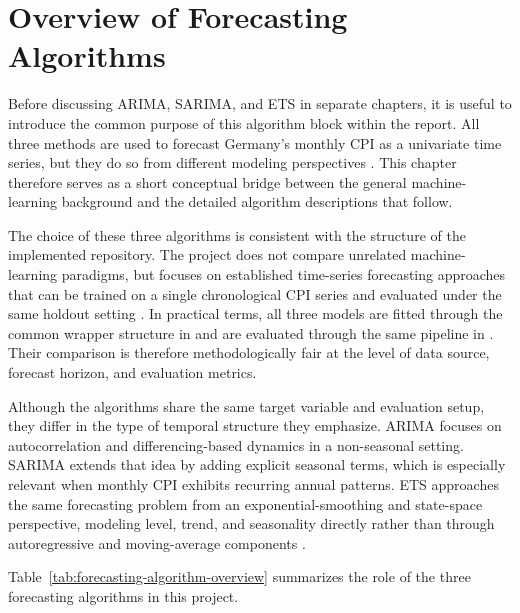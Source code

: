 %
%
%

\chapter{Overview of Forecasting Algorithms}
\label{ch:forecasting-algorithm-overview}

Before discussing ARIMA, SARIMA, and ETS in separate chapters, it is useful to introduce the common purpose of this algorithm block within the report. All three methods are used to forecast Germany's monthly CPI as a univariate time series, but they do so from different modeling perspectives \cite{Box2015,Hyndman2021}. This chapter therefore serves as a short conceptual bridge between the general machine-learning background and the detailed algorithm descriptions that follow.

The choice of these three algorithms is consistent with the structure of the implemented repository. The project does not compare unrelated machine-learning paradigms, but focuses on established time-series forecasting approaches that can be trained on a single chronological CPI series and evaluated under the same holdout setting \cite{Hyndman2021,Hu2025}. In practical terms, all three models are fitted through the common wrapper structure in  and are evaluated through the same pipeline in . Their comparison is therefore methodologically fair at the level of data source, forecast horizon, and evaluation metrics.

Although the algorithms share the same target variable and evaluation setup, they differ in the type of temporal structure they emphasize. ARIMA focuses on autocorrelation and differencing-based dynamics in a non-seasonal setting. SARIMA extends that idea by adding explicit seasonal terms, which is especially relevant when monthly CPI exhibits recurring annual patterns. ETS approaches the same forecasting problem from an exponential-smoothing and state-space perspective, modeling level, trend, and seasonality directly rather than through autoregressive and moving-average components \cite{Box2015,Hyndman2021}.

Table~\ref{tab:forecasting-algorithm-overview} summarizes the role of the three forecasting algorithms in this project.


